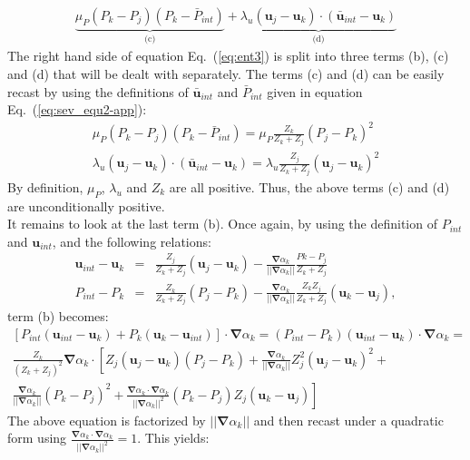 \documentclass[preprint,10pt]{elsarticle}
\newcommand{\grad}{\mbold{\nabla}}
\newcommand{\mbold}[1]{\boldsymbol#1}
\newcommand{\eqt}[1]{Eq.~(\ref{#1})}                     %
\begin{document}
\begin{appendices}
\begin{eqnarray}
\underbrace{\mu_P (P_k-P_j)(P_k-\bar{P}_{int})}_\textrm{(c)} + \underbrace{\lambda_u(\mbold u_j-\mbold u_k)\cdot(\bar{\mbold u}_{int}-\mbold u_k)}_\textrm{(d)}
\end{eqnarray}
The right hand side of equation \eqt{eq:ent3} is split into three terms (b), (c) and (d) that will be dealt with separately. The terms (c) and (d) can be easily recast by using the definitions of $\bar{\mbold u}_{int}$ and $\bar{P}_{int}$ given in equation \eqt{eq:sev_equ2-app}:
\begin{eqnarray}
\label{eq:ent4}
\mu_P (P_k-P_j)(P_k-\bar{P}_{int}) = \mu_P \frac{Z_k}{Z_k+Z_j} (P_j - P_k)^2\nonumber\\
\lambda_u(\mbold u_j-\mbold u_k)\cdot(\bar{\mbold u}_{int}-\mbold u_k) = \lambda_u \frac{Z_j}{Z_k+Z_j} (\mbold u_j - \mbold u_k)^2 
\end{eqnarray}
By definition, $\mu_P$, $\lambda_u$ and $Z_k$ are all positive. Thus, the above terms (c) and (d) are unconditionally positive. \\
It remains to look at the last term (b). Once again, by using the definition of $P_{int}$ and $\mbold u_{int}$, and the following relations:
\begin{eqnarray}
\label{eq:ent4bis}
\mbold u_{int}-\mbold u_k &=& \frac{Z_j}{Z_k+Z_j}(\mbold u_j-\mbold u_k) -  \frac{\grad \alpha_k}{|| \grad \alpha_k ||} \frac{Pk-P_j}{Z_k+Z_j} \nonumber\\
P_{int}-P_k &=& \frac{Z_k}{Z_k+Z_j} (P_j-P_k) - \frac{\grad \alpha_k}{|| \grad \alpha_k ||} \frac{Z_k Z_j}{Z_k+Z_j} (\mbold u_k-\mbold u_j), \nonumber 
\end{eqnarray}
term (b) becomes:
\begin{eqnarray}
\label{eq:ent5}
\left[ P_{int} (\mbold u_{int}-\mbold u_k) + P_k (\mbold u_k-\mbold u_{int}) \right] \cdot \grad \alpha_k = (P_{int}-P_k)(\mbold u_{int}-\mbold u_k)\cdot \grad \alpha_k=  \nonumber\\ \frac{Z_k}{\left( Z_k+Z_j \right)^2} \grad \alpha_k \cdot \left[ Z_j (\mbold u_j-\mbold u_k)(P_j-P_k)+\frac{\grad \alpha_k}{|| \grad \alpha_k ||} Z_j^2 (\mbold u_j-\mbold u_k)^2 \right. + \nonumber \\ \left. \frac{\grad \alpha_k}{|| \grad \alpha_k ||}(P_k-P_j)^2 +  \frac{\grad \alpha_k \cdot \grad \alpha_k}{|| \grad \alpha_k ||^2}(P_k-P_j)Z_j (\mbold u_k-\mbold u_j) \right] 
\end{eqnarray}
The above equation is factorized by $|| \grad \alpha_k ||$ and then recast under a quadratic form using $\frac{\grad \alpha_k \cdot \grad \alpha_k}{|| \grad \alpha_k ||^2} = 1$. This yields:

\end{appendices}
\end{document}
